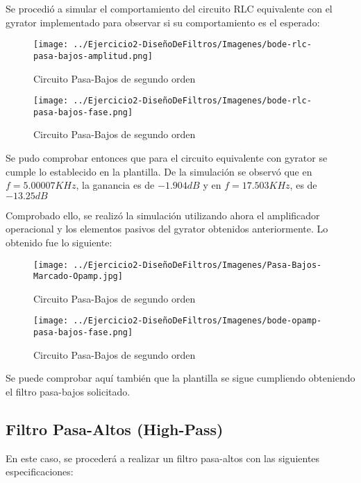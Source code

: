 Se procedió a simular el comportamiento del circuito RLC equivalente con el gyrator implementado para observar si su comportamiento es el esperado:


\begin{figure}[H]
    \centering
    \texttt{[image: ../Ejercicio2-DiseñoDeFiltros/Imagenes/bode-rlc-pasa-bajos-amplitud.png]}
    \caption{Circuito Pasa-Bajos de segundo orden}
\end{figure}

\begin{figure}[H]
    \centering
    \texttt{[image: ../Ejercicio2-DiseñoDeFiltros/Imagenes/bode-rlc-pasa-bajos-fase.png]}
    \caption{Circuito Pasa-Bajos de segundo orden}
\end{figure}

Se pudo comprobar entonces que para el circuito equivalente con gyrator se cumple lo establecido en la plantilla.
De la simulación se observó que en $f=5.00007 KHz$, la ganancia es de $-1.904 dB$ y en $f=17.503KHz$, es de $-13.25 dB$

Comprobado ello, se realizó la simulación utilizando ahora el amplificador operacional y los elementos pasivos del gyrator obtenidos anteriormente.
Lo obtenido fue lo siguiente:

\begin{figure}[H]
    \centering
    \texttt{[image: ../Ejercicio2-DiseñoDeFiltros/Imagenes/Pasa-Bajos-Marcado-Opamp.jpg]}
    \caption{Circuito Pasa-Bajos de segundo orden}
\end{figure}

\begin{figure}[H]
    \centering
    \texttt{[image: ../Ejercicio2-DiseñoDeFiltros/Imagenes/bode-opamp-pasa-bajos-fase.png]}
    \caption{Circuito Pasa-Bajos de segundo orden}
\end{figure}

Se puede comprobar aquí también que la plantilla se sigue cumpliendo obteniendo el filtro pasa-bajos solicitado.


\subsection{Filtro Pasa-Altos (High-Pass)}

En este caso, se procederá a realizar un filtro pasa-altos con las siguientes especificaciones:


